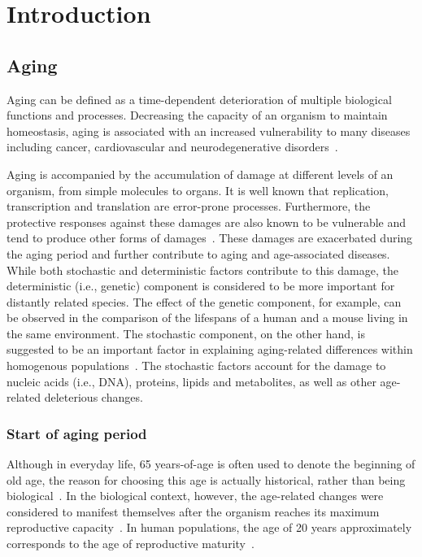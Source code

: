 \chapter{Introduction}
\label{chp:b1}

\section{Aging}
Aging can be defined as a time-dependent deterioration of multiple biological functions and processes.
Decreasing the capacity of an organism to maintain homeostasis, 
aging is associated with an increased vulnerability to many diseases including cancer, cardiovascular and neurodegenerative disorders~\autocite{Niccoli2012}.

Aging is accompanied by the accumulation of damage at different levels of an organism, from simple molecules to organs.
It is well known that replication, transcription and translation are error-prone processes.
Furthermore, the protective responses against these damages are also known to be vulnerable and tend to produce other forms of damages~\autocite{Gladyshev2016}.
These damages are exacerbated during the aging period and further contribute to aging and age-associated diseases.
While both stochastic and deterministic factors contribute to this damage, 
the deterministic (i.e., genetic) component is considered to be more important for distantly related species.
The effect of the genetic component, for example, can be observed in the comparison of the lifespans of a human and a mouse living in the same environment.
The stochastic component, on the other hand, is suggested to be an important factor in explaining aging-related differences within homogenous populations~\autocite{Gladyshev2016}.
The stochastic factors account for the damage to nucleic acids (i.e., DNA), proteins, lipids and metabolites, as well as other age-related deleterious changes.

\subsection{Start of aging period}
Although in everyday life, 65 years-of-age is often used to denote the beginning of old age, 
the reason for choosing this age is actually historical, rather than being biological~\autocite{Covey1992}.
In the biological context, however, the age-related changes were considered to manifest themselves after the organism reaches its maximum reproductive capacity~\autocite{Vijg2009}.
In human populations, the age of 20 years approximately corresponds to the age of reproductive maturity~\autocite{Walker2006}.

